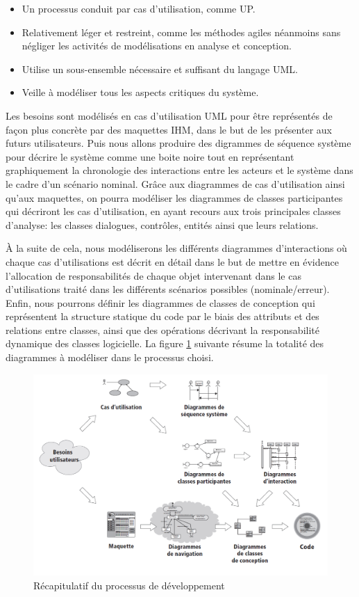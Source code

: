 \begin{itemize}
    \item [\textbullet] Un processus conduit par cas d’utilisation, comme UP.
    \item [\textbullet] Relativement léger et restreint, comme les méthodes
        agiles néanmoins sans négliger les activités de modélisations en analyse
        et conception.  
    \item [\textbullet] Utilise un sous-ensemble nécessaire et
    suffisant du langage UML.
    \item [\textbullet] Veille à modéliser tous les aspects critiques du système.
\end{itemize}
        
Les besoins sont modélisés en cas d’utilisation UML pour être représentés de
façon plus concrète par des maquettes IHM, dans le but de les présenter aux
futurs utilisateurs. Puis nous allons produire des digrammes de séquence système
pour décrire le système comme une boite noire tout en représentant
graphiquement la chronologie des interactions entre les acteurs et le système
dans le cadre d’un scénario nominal. Grâce aux diagrammes de cas d’utilisation
ainsi qu’aux maquettes, on pourra modéliser les diagrammes de classes
participantes qui décriront les cas d’utilisation, en ayant recours aux trois
principales classes d’analyse: les classes dialogues, contrôles, entités ainsi
que leurs relations.

À la suite de cela, nous modéliserons les différents diagrammes d’interactions
où chaque cas d’utilisations est décrit en détail dans le but de mettre en
évidence l’allocation de responsabilités de chaque objet intervenant dans le cas
d’utilisations traité dans les différents scénarios possibles
(nominale/erreur). Enfin, nous pourrons définir les diagrammes de classes de
conception qui représentent la structure statique du code par le biais des
attributs et des relations entre classes, ainsi que des opérations décrivant la
responsabilité dynamique des classes logicielle.  La figure \ref{fig1} suivante
résume la totalité des diagrammes à modéliser dans le processus choisi.
\clearpage
\begin{figure}[h!]
  \centering
  \includegraphics[width=12cm]{images/processus_dev.png}
  \vspace{-10pt}
  \caption{Récapitulatif du processus de développement \cite{5}}
  \label{fig1}
\end{figure}

